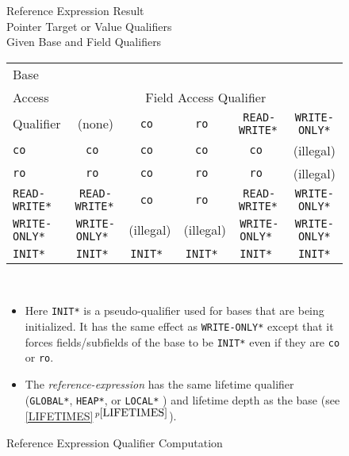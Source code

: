 \documentclass[12pt]{article}
\newcommand{\itemref}[1]{\ref{#1}$\,^{p\pageref{#1}}$}
\newlength{\figurewidth}
\newenvironment{boxedfigure}[1][!btp]%
	{\begin{figure*}[#1]
	 \begin{lrbox}{\figurebox}
	 \begin{minipage}{\figurewidth}

	 \vspace*{1ex}}%
	{
	 \vspace*{1ex}

	 \end{minipage}
	 \end{lrbox}

	 \centering
	 \fbox{\hspace*{0.1in}\usebox{\figurebox}\hspace*{0.1in}}
	 \end{figure*}}
\begin{document}
\begin{boxedfigure}[!t]
\newcommand{\tts}{\tt \small}
\begin{center}
Reference Expression Result \\
Pointer Target or Value Qualifiers \\
Given Base and Field Qualifiers
\\[1ex]
\begin{tabular}{|l|c|c|c|c|c|}
\multicolumn{1}{l}{Base}	\\
\multicolumn{1}{l}{Access}	& \multicolumn{5}{c}{Field Access Qualifier}
\\\cline{2-6}
\multicolumn{1}{l|}{Qualifier}
       & (none) & \tt co & \tt ro & \tts *READ-WRITE* & \tts *WRITE-ONLY*
\\\hline
\tt co & \tt co & \tt co & \tt co & \tt co & (illegal)
\\\hline
\tt ro & \tt ro & \tt co & \tt ro & \tt ro & (illegal)
\\\hline
\tts *READ-WRITE* & \tts *READ-WRITE* & \tt co & \tt ro & \tts *READ-WRITE*
		  & \tts *WRITE-ONLY*
\\\hline
\tts *WRITE-ONLY* & \tts *WRITE-ONLY* & (illegal) & (illegal)
                 & \tts *WRITE-ONLY* & \tts *WRITE-ONLY*
\\\hline
\tts *INIT* & \tts *INIT* & \tts *INIT* & \tts *INIT* & \tts *INIT*
            & \tts *INIT*
\\\hline
\end{tabular}
\\[1ex]
\begin{minipage}{6.0in}
\raggedright
\begin{itemize}
\item Here\label{INIT-FORCING}
{\tt *INIT*} is a pseudo-qualifier used for bases
that are being initialized.  It has the same effect as {\tt *WRITE-ONLY*}
except that it forces fields/subfields of the base to be {\tt *INIT*}
even if they are {\tt co} or {\tt ro}.
\item The {\em reference-expression} has the same lifetime qualifier
({\tt *GLOBAL*}, {\tt *HEAP*}, or {\tt *LOCAL*} )
and lifetime depth as the base (see \itemref{LIFETIMES}).
\end{itemize}
\end{minipage}
\end{center}

\caption{Reference Expression Qualifier Computation}
\label{REFERENCE-EXPRESSION-QUALIFIER-COMPUTATION}
\end{boxedfigure}
\end{document}
